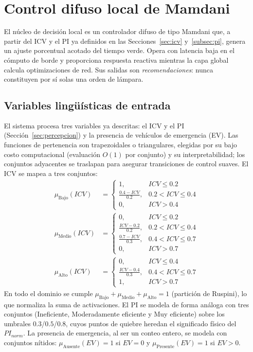 \section{Control difuso local de Mamdani}\label{sec:control-difuso}

El núcleo de decisión local es un controlador difuso de tipo Mamdani que, a partir del ICV y el
PI ya definidos en las Secciones~\ref{sec:icv} y~\ref{subsec:pi}, genera un ajuste porcentual
acotado del tiempo verde. Opera con latencia baja en el cómputo de borde y proporciona
respuesta reactiva mientras la capa global calcula optimizaciones de red. Sus salidas son
\emph{recomendaciones}: nunca constituyen por sí solas una orden de lámpara.

\subsection{Variables lingüísticas de entrada}\label{subsec:fuzzy-entrada}

El sistema procesa tres variables ya descritas: el ICV y el PI (Sección~\ref{sec:percepcion}) y
la presencia de vehículos de emergencia (EV). Las funciones de pertenencia son trapezoidales o
triangulares, elegidas por su bajo costo computacional (evaluación $O(1)$ por conjunto) y su
interpretabilidad; los conjuntos adyacentes se traslapan para asegurar transiciones de control
suaves. El ICV se mapea a tres conjuntos:
\[
\begin{aligned}
\mu_{\text{Bajo}}(ICV)&=
\begin{cases}1,&ICV\le 0.2\\ \frac{0.4-ICV}{0.2},&0.2<ICV\le 0.4\\ 0,&ICV>0.4\end{cases}\\[8pt]
\mu_{\text{Medio}}(ICV)&=
\begin{cases}0,&ICV\le 0.2\\ \frac{ICV-0.2}{0.2},&0.2<ICV\le 0.4\\ \frac{0.7-ICV}{0.3},&0.4<ICV\le 0.7\\ 0,&ICV>0.7\end{cases}\\[8pt]
\mu_{\text{Alto}}(ICV)&=
\begin{cases}0,&ICV\le 0.4\\ \frac{ICV-0.4}{0.3},&0.4<ICV\le 0.7\\ 1,&ICV>0.7\end{cases}
\end{aligned}
\]
En todo el dominio se cumple $\mu_{\text{Bajo}}+\mu_{\text{Medio}}+\mu_{\text{Alto}}=1$
(partición de Ruspini), lo que normaliza la suma de activaciones. El PI se modela de forma
análoga con tres conjuntos (Ineficiente, Moderadamente eficiente y Muy eficiente) sobre los
umbrales $0.3$/$0.5$/$0.8$, cuyos puntos de quiebre heredan el significado físico del
$PI_{norm}$. La presencia de emergencia, al ser un conteo entero, se modela con conjuntos
nítidos: $\mu_{\text{Ausente}}(EV)=1$ si $EV=0$ y $\mu_{\text{Presente}}(EV)=1$ si $EV>0$.

